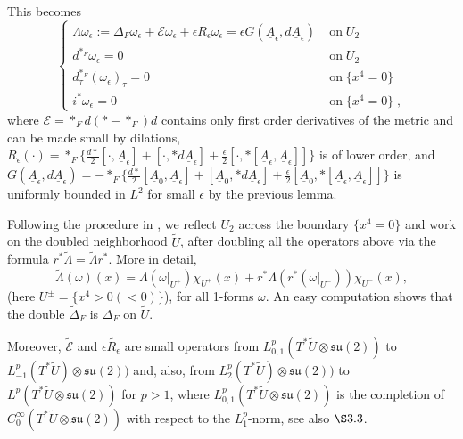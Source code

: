 \documentclass[11pt]{article}
\numberwithin{equation}{section} \setlength{\topmargin}{-35pt}
\begin{document}
\noindent This becomes
\begin{equation}
\label{omegaloc1} \left \{
\begin{array}{ll}
\Lambda \omega_\epsilon:= \Delta_F \omega_\epsilon + \mathcal{E}
\omega_\epsilon +\epsilon
R_\epsilon \omega_\epsilon  =\epsilon G(\underline{A}_\epsilon, d\underline{A}_\epsilon) & \;\text{on}\;U_2\\
d^{*_F} \omega_\epsilon =0 & \;\text{on}\;U_2\\
d^{*_F}_\tau (\omega_\epsilon)_\tau =0 & \;\text{on}\;\{x^4=0\}\\
i^*\omega_\epsilon= 0& \;\text{on}\;\{x^4=0\}\;,
\end{array}
\right .
\end{equation}
where $\mathcal{E}=*_F d(*-*_F)d$ contains only first order
derivatives of the metric and can be made small by dilations,
$R_\epsilon (\cdot) =
*_F \{ \frac{d*}{2}[\cdot, \underline{A}_\epsilon]+ [\cdot,
*d\underline{A}_\epsilon] +\frac {\epsilon}
{2}[\cdot,* [\underline{A}_\epsilon,\underline{A}_\epsilon]]\}$ is
of lower order, and $G(\underline{A}_\epsilon,
d\underline{A}_\epsilon)= -*_F \{ \frac{d*}{2}[\underline{A}_0,
\underline{A}_\epsilon]+ [\underline{A}_0,
*d\underline{A}_\epsilon] +\frac {\epsilon}
{2}[\underline{A}_0,*
[\underline{A}_\epsilon,\underline{A}_\epsilon]]\}$ is uniformly
bounded in $L^2$ for small $\epsilon$ by the previous lemma.

Following the procedure in \cite{Marini}, we reflect $U_2$ across
the boundary $\{x^4=0\}$ and work on the doubled neighborhood
$\tilde U$, after doubling all the operators above via the formula
$r^*\tilde \Lambda = \tilde \Lambda r^*.$ More in detail,
$$\tilde\Lambda(\omega)(x)=\Lambda(\omega\vert_{U^+})\chi_{U^+}(x)
+r^*\Lambda(r^*(\omega\vert_{U^-}))\chi_{U^-}(x),$$ (here
$U^\pm=\{x^4
>0 (<0)\}$), for all 1-forms $\omega$. An easy computation shows that
the double $\tilde\Delta_F$ is $\Delta_F$ on $\tilde U.$

Moreover, $\tilde{\mathcal{E}}$ and $\epsilon \tilde{R_\epsilon}$
are small operators from $L^p_{0,1}(T^{\ast}\tilde
{U}\otimes\mathfrak{su}(2))$ to
$L^p_{-1}(T^{\ast}\tilde{U})\otimes\mathfrak{su}(2))$ and, also,
from $L^p_2(T^{\ast}\tilde {U}) \otimes\mathfrak{su}(2))$ to
$L^p(T^{\ast}\tilde {U}\otimes\mathfrak{su}(2))$ for $p>1$, where
$L^p_{0,1}(T^{\ast}\tilde{U}\otimes\mathfrak{su}(2))$ is the
completion of
$C^{\infty}_0(T^{\ast}\tilde{U}\otimes\mathfrak{su}(2))$ with
respect to the $L^p_1$-norm, see also $\S3.3$.
\end{document}
